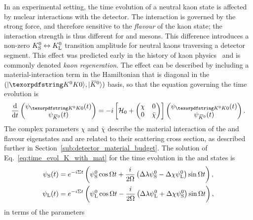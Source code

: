 In an experimental setting, the time evolution of a neutral kaon state is affected by nuclear interactions with the detector. The interaction is governed by the strong force, and therefore sensitive to the \emph{flavour} of the kaon state; the interaction strength is thus different for \Kz and \Kzb mesons. This difference introduces a non-zero ${{K}^0_{\mathrm{S}}}\leftrightarrow{\ensuremath{{K}^0_{\mathrm{L}}}}$ transition amplitude for neutral kaons traversing a detector segment. This effect was predicted early in the history of kaon physics~\cite{paisNoteDecayAbsorption1955} and is commonly denoted \emph{kaon regeneration}. The effect can be described by including a material-interaction term in the Hamiltonian
that is diagonal in the $(\ket\Kz, \ket \Kzb)$ basis, so that the equation governing the time evolution is~\cite{goodRelationScatteringAbsorption1957,fetscherRegenerationArbitraryCoherent1996}
\begin{align}\label{eq:time_evol_K_with_mat}
      \frac{\text d}{\text dt} \begin{pmatrix}\psi_{\Kz}(t)\\\psi_{\Kzb}(t)\end{pmatrix} = -i\left[
      \mathcal H_0 + \begin{pmatrix}
          \chi & 0 \\ 0 & \bar \chi
      \end{pmatrix}
      \right]
      \begin{pmatrix}\psi_{\Kz}(t)\\\psi_{\Kzb}(t)\end{pmatrix}.
\end{align}
The complex parameters $\chi$ and $\bar\chi$ describe the material interaction of the \Kz and \Kzb flavour eigenstates and are related to their scattering cross section, as described further in Section~\ref{sub:detector_material_budget}. 
The solution of Eq.~\eqref{eq:time_evol_K_with_mat} for the time evolution in the \KS and \KL states is~\cite{fetscherRegenerationArbitraryCoherent1996}
\begin{align} 
\begin{split} \label{eq:mat_time_dep}
\psi_{\rm{S}}(t) &= e^{-i\Sigma t}\left( \psi^0_{\rm S}\cos \Omega t  
                + \frac{i}{2\Omega}\left(\Delta \lambda \psi^0_{\rm S} - \Delta \chi \psi^0_{\rm L}\right) \sin \Omega t \right) ,\\
\psi_{\rm{L}}(t) &= e^{-i\Sigma t}\left( \psi^0_{\rm L}\cos \Omega t  
                - \frac{i}{2\Omega}\left(\Delta \lambda \psi^0_{\rm L} + \Delta \chi \psi^0_{\rm S}\right) \sin \Omega t \right) ,
\end{split}
\end{align} in terms of the parameters
